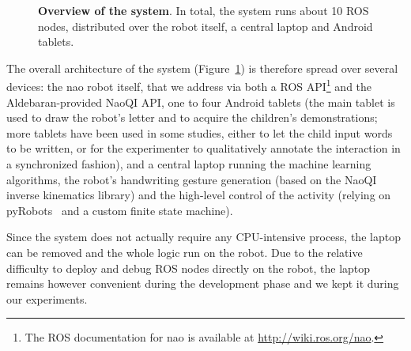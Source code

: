 \documentclass{article}
\begin{document}
\begin{figure}[ht!]
{
}

\caption{\small \textbf{Overview of the system}. In total, the system runs about 10 ROS nodes,
    distributed over the robot itself, a central laptop and Android tablets.}

    \label{fig:archi}
\end{figure}

The overall architecture of the system (Figure~\ref{fig:archi}) is therefore
spread over several devices: the {\sc nao} robot itself, that we address via
both a ROS API\footnote{The ROS documentation for {\sc nao} is available at
\url{http://wiki.ros.org/nao}.} and the Aldebaran-provided NaoQI API, one to
four Android tablets (the main tablet is used to draw the robot's letter and to
acquire the children's demonstrations; more tablets have been used in some
studies, either to let the child input words to be written, or for the
experimenter to qualitatively annotate the interaction in a synchronized
fashion), and a central laptop running the machine learning algorithms, the
robot's handwriting gesture generation (based on the NaoQI inverse kinematics
library) and the high-level control of the activity (relying on {\sc
pyRobots}~\cite{lemaignan2015pyrobots} and a custom finite state machine).

Since the system does not actually require any CPU-intensive process, the laptop
can be removed and the whole logic run on the robot. Due to the relative
difficulty to deploy and debug ROS nodes directly on the robot, the laptop
remains however convenient during the development phase and we kept it during
our experiments.
\end{document}
